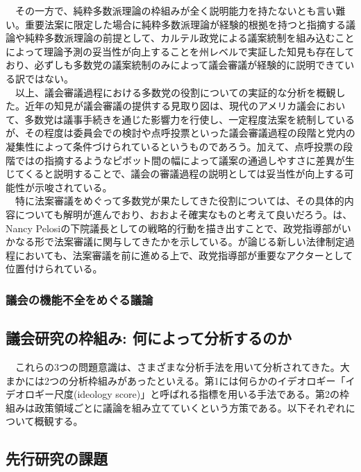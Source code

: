 　その一方で、純粋多数派理論の枠組みが全く説明能力を持たないとも言い難い。重要法案に限定した場合に純粋多数派理論が経験的根拠を持つと指摘する議論\citep*{Gray2019-sv}や純粋多数派理論の前提として、カルテル政党による議案統制を組み込むことによって理論予測の妥当性が向上することを州レベルで実証した知見\citep*{Crosson2019-xb}も存在しており、必ずしも多数党の議案統制のみによって議会審議が経験的に説明できている訳ではない。\\
　以上、議会審議過程における多数党の役割についての実証的な分析を概観した。近年の知見が議会審議の提供する見取り図は、現代のアメリカ議会において、多数党は議事手続きを通じた影響力を行使し、一定程度法案を統制しているが、その程度は委員会での検討や点呼投票といった議会審議過程の段階と党内の凝集性によって条件づけられているというものであろう。加えて、点呼投票の段階では\citet*{Krehbiel1998-ob,Krehbiel2010-ob}の指摘するようなピボット間の幅によって議案の通過しやすさに差異が生じてくると説明することで、議会の審議過程の説明としては妥当性が向上する可能性が示唆されている。\\
　特に法案審議をめぐって多数党が果たしてきた役割については、その具体的内容についても解明が進んでおり、おおよそ確実なものと考えて良いだろう。\citet*{Rosenthal2008-xb,Peters2010-ve}は、Nancy Pelosiの下院議長としての戦略的行動を描き出すことで、政党指導部がいかなる形で法案審議に関与してきたかを示している。\citet*{Sinclair1997-jm,Sinclair2016-kh}が論じる新しい法律制定過程においても、法案審議を前に進める上で、政党指導部が重要なアクターとして位置付けられている。\\

\subsubsection{議会の機能不全をめぐる議論}


\subsection{議会研究の枠組み: 何によって分析するのか}
　これらの3つの問題意識は、さまざまな分析手法を用いて分析されてきた。大まかには2つの分析枠組みがあったといえる。第1には何らかのイデオロギー「イデオロギー尺度(ideology score)」と呼ばれる指標を用いる手法である。第2の枠組みは政策領域ごとに議論を組み立てていくという方策である。以下それぞれについて概観する。\\


\subsection{先行研究の課題}
